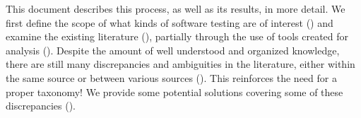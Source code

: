     \begin{bigLandscape}
        
    \end{bigLandscape}

\fi
This document describes this process, as well as its results, in more detail.
We first define the scope of
what kinds of software testing are of interest () and examine the
existing literature ()\ifnotpaper, partially through the use
of tools created for analysis ()\fi. Despite the amount of well
understood and organized knowledge, there are still many discrepancies and
ambiguities in the literature, either within the same source or between various
sources (). This reinforces the need for a proper taxonomy! We
provide some potential solutions covering some of these discrepancies
().